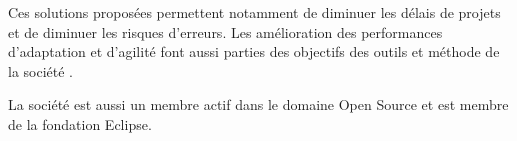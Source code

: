 Ces solutions proposées permettent notamment de diminuer les délais de projets et de diminuer les risques d'erreurs. Les amélioration des performances d'adaptation et d'agilité font aussi parties des objectifs des outils et méthode de la société \kwobeo{}.

La société \kwobeo{} est aussi un membre actif dans le domaine Open Source et est membre de la fondation Eclipse.






